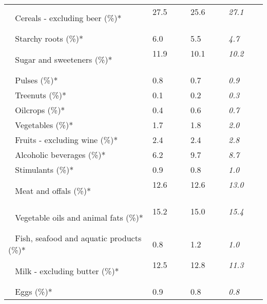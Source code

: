 \begin{tabular}{L{3.9cm} R{1cm} R{1cm} R{1cm}}
	 ~ Cereals - excluding beer (\%)* & 27.5 ~ \ \ & 25.6 ~ \ \ & \textit{27.1} ~ \ \ \\ 
	 ~ Starchy roots (\%)* & 6.0 ~ \ \ & 5.5 ~ \ \ & \textit{4.7} ~ \ \ \\ 
	 ~ Sugar and sweeteners (\%)* & 11.9 ~ \ \ & 10.1 ~ \ \ & \textit{10.2} ~ \ \ \\ 
	 ~ Pulses (\%)* & 0.8 ~ \ \ & 0.7 ~ \ \ & \textit{0.9} ~ \ \ \\ 
	 ~ Treenuts (\%)* & 0.1 ~ \ \ & 0.2 ~ \ \ & \textit{0.3} ~ \ \ \\ 
	 ~ Oilcrops (\%)* & 0.4 ~ \ \ & 0.6 ~ \ \ & \textit{0.7} ~ \ \ \\ 
	 ~ Vegetables (\%)* & 1.7 ~ \ \ & 1.8 ~ \ \ & \textit{2.0} ~ \ \ \\ 
	 ~ Fruits - excluding wine (\%)* & 2.4 ~ \ \ & 2.4 ~ \ \ & \textit{2.8} ~ \ \ \\ 
	 ~ Alcoholic beverages (\%)* & 6.2 ~ \ \ & 9.7 ~ \ \ & \textit{8.7} ~ \ \ \\ 
	 ~ Stimulants (\%)* & 0.9 ~ \ \ & 0.8 ~ \ \ & \textit{1.0} ~ \ \ \\ 
	 ~ Meat and offals (\%)* & 12.6 ~ \ \ & 12.6 ~ \ \ & \textit{13.0} ~ \ \ \\ 
	 ~ Vegetable oils and animal fats (\%)* & 15.2 ~ \ \ & 15.0 ~ \ \ & \textit{15.4} ~ \ \ \\ 
	 ~ Fish, seafood and aquatic products (\%)* & 0.8 ~ \ \ & 1.2 ~ \ \ & \textit{1.0} ~ \ \ \\ 
	 ~ Milk - excluding butter (\%)* & 12.5 ~ \ \ & 12.8 ~ \ \ & \textit{11.3} ~ \ \ \\ 
	 ~ Eggs (\%)* & 0.9 ~ \ \ & 0.8 ~ \ \ & \textit{0.8} ~ \ \ \\ 
       \toprule
      \end{tabular}
      \clearpage
{}

